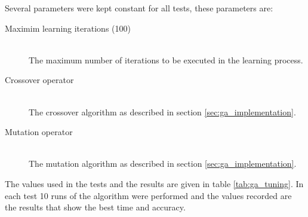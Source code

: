 \documentclass[a4paper]{article}
\begin{document}
Several parameters were kept constant for all tests, these parameters are:

\begin{description}
  \item[Maximim learning iterations (100)] \hfill \\
    The maximum number of iterations to be executed in the learning process.
  \item[Crossover operator] \hfill \\
    The crossover algorithm as described in section \ref{sec:ga_implementation}.
  \item[Mutation operator] \hfill \\
    The mutation algorithm as described in section \ref{sec:ga_implementation}.
\end{description}

The values used in the tests and the results are given in table
\ref{tab:ga_tuning}. In each test 10 runs of the algorithm were performed and
the values recorded are the results that show the best time and accuracy.
\end{document}
